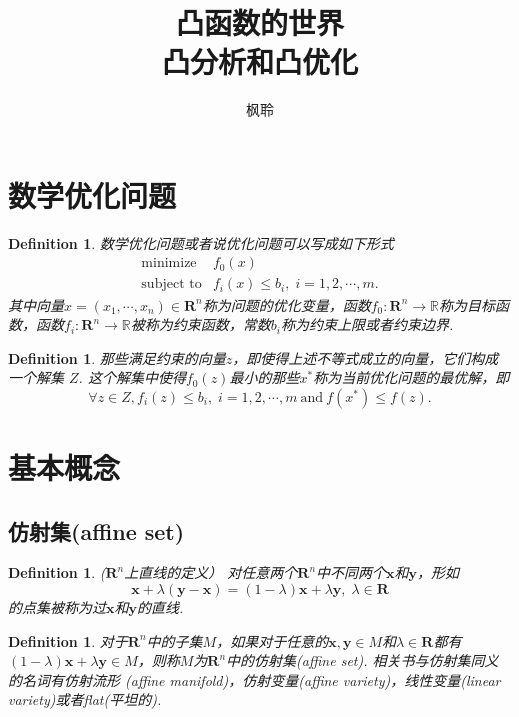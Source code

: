 \documentclass{article}
\newtheorem{definition}[theorem]{Definition}
\newcommand*{\xfunc}[4]{{#2}\colon{#3}{#1}{#4}}
\newcommand*{\func}[3]{\xfunc{\to}{#1}{#2}{#3}}
\newcommand{\vect}[1]{\mathbf{#1}} %
\newcommand{\thereal}{\mathbf{R}} %
\begin{document}
\title{凸函数的世界 \\ \small{{\color{red}凸分析}和{\color{red}凸优化}}}

\author{枫聆}
\maketitle
\tableofcontents

\newpage
\section{数学优化问题}

\begin{definition}
\rm {\color{red}数学优化}问题或者说{\color{red}优化问题}可以写成如下形式
$$
\begin{array}{ll}
\text{minimize} & f_0(x) \\
\text{subject to} & f_i(x) \leq b_i, \; i = 1,2,\cdots,m.
\end{array}
$$
其中向量$x = (x_1,\cdots,x_n) \in \mathbf{R}^n$称为问题的{\color{red}优化变量}，函数$\func{f_0}{\mathbf{R}^n}{\mathbb{R}}$称为{\color{red}目标函数}，函数$\func{f_i}{\mathbf{R}^n}{\mathbb{R}}$被称为{\color{red}约束函数}，常数$b_i$称为{\color{red}约束上限}或者{\color{red}约束边界}.
\end{definition}

\begin{definition}
\rm  那些满足约束的向量$z$，即使得上述不等式成立的向量，它们构成一个{\color{red}解集} $Z$. 这个解集中使得$f_0(z)$最小的那些$x^*$称为当前优化问题的{\color{red}最优解}，即
$$
\forall z \in Z, f_i(z) \leq b_i,\;i=1,2,\cdots,m~\text{and}~f(x^*) \leq f(z).
$$
\end{definition}

\newpage
\section{基本概念}

\subsection{仿射集(affine set)}

\begin{definition}
\rm {\color{red} ($\thereal^n$上直线的定义）} 对任意两个$\thereal^n$中不同两个$\mathbf{x}$和$\mathbf{y}$，形如
$$
\mathbf{x} + \lambda(\mathbf{y}-\mathbf{x}) = (1-\lambda)\mathbf{x} + \lambda\mathbf{y},\; \lambda \in \thereal  
$$
的点集被称为过$\mathbf{x}$和$\mathbf{y}$的直线.
\end{definition}

\begin{definition}
\rm 对于$\thereal^n$中的子集$M$，如果对于任意的$\vect{x},\vect{y} \in M$和$\lambda \in \thereal$都有$(1-\lambda)\vect{x} + \lambda\vect{y} \in M$，则称$M$为$\thereal^n$中的{\color{red}仿射集}(affine set). 相关书与仿射集同义的名词有{\color{red}仿射流形
}(affine manifold)，{\color{red}仿射变量}(affine variety)，{\color{red}线性变量}(linear variety)或者{\color{red}flat}(平坦的).
\end{definition}
\end{document}
